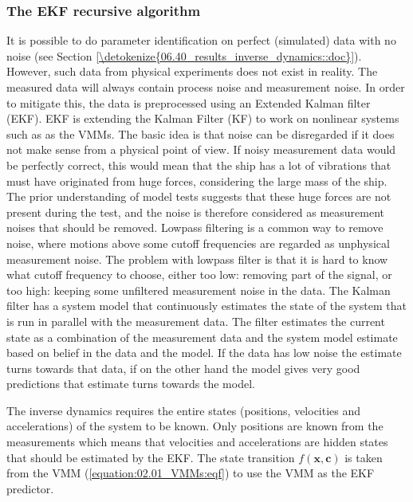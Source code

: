 \documentclass[review]{elsarticle}
\begin{document}
\subsubsection{The EKF recursive algorithm}
\label{\detokenize{04.01_EK:the-ekf-recursive-algorithm}}
\sphinxAtStartPar
It is possible to do parameter identification on perfect (simulated) data with no noise (see Section \ref{\detokenize{06.40_results_inverse_dynamics::doc}}). However, such data from physical experiments does not exist in reality. The measured data will always contain process noise and measurement noise. In order to mitigate this, the data is pre\sphinxhyphen{}processed using an Extended Kalman filter (EKF). EKF  is extending the Kalman Filter (KF) to work on nonlinear systems such as as the VMMs. The basic idea is that noise can be disregarded if it does not make sense from a physical point of view. If noisy measurement data would be perfectly correct, this would mean that the ship has a lot of vibrations that must have originated from huge forces, considering the large mass of the ship. The prior understanding of model tests suggests that these huge forces are not present during the test, and the noise is therefore considered as measurement noises that should be removed. Low\sphinxhyphen{}pass filtering is a common way to remove noise, where motions above some cut\sphinxhyphen{}off frequencies are regarded as unphysical measurement noise. The problem with low\sphinxhyphen{}pass filter is that it is hard to know what cut\sphinxhyphen{}off frequency to choose, either too low: removing part of the signal, or too high: keeping some unfiltered measurement noise in the data. The Kalman filter has a system model that continuously estimates the state of the system that is run in parallel with the measurement data. The filter estimates the current state as a combination of the measurement data and the system model estimate based on belief in the data and the model. If the data has low noise the estimate turns towards that data, if on the other hand the model gives very good predictions that estimate turns towards the model.

\sphinxAtStartPar
The inverse dynamics requires the entire states (positions, velocities and accelerations) of the system to be known. Only positions are known from the measurements which means that velocities and accelerations are hidden states that should be estimated by the EKF.
The state transition \(f(\mathbf{x},\mathbf{c})\) is taken from the VMM (\autoref{equation:02.01_VMMs:eqf}) to use the VMM as the EKF predictor.
\end{document}
